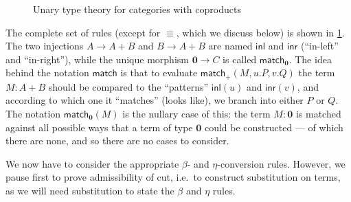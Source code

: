 \documentclass{book}
\def\idfunc{\mathsf{id}}
\let\types\vdash
\def\type{\;\ftype}
\def\plusE{\mathord{+}E}
\def\plusI{\mathord{+}I}
\def\inl{\mathsf{inl}}
\def\inr{\mathsf{inr}}
\def\acase#1#2{\mathsf{match}_{#1+#2}}
\def\case{\mathsf{match}_+}
\def\match{\mathsf{match}}
\def\zero{\mathbf{0}}
\def\zeroE{\mathbf{0}E}
\def\abort{\match_{\zero}}
\begin{document}
\begin{figure}
  \centering
  \caption{Unary type theory for categories with coproducts}
  \label{fig:catcoprod}
\end{figure}

The complete set of rules (except for $\equiv$, which we discuss below) is shown in \cref{fig:catcoprod}.
The two injections $A\to A+B$ and $B\to A+B$ are named $\inl$ and $\inr$ (``in-left'' and ``in-right''), while the unique morphism $\zero \to C$ is called $\abort$.
The idea behind the notation $\match$ is that to evaluate $\case(M,u.P,v.Q)$ the term $M:A+B$ should be compared to the ``patterns'' $\inl(u)$ and $\inr(v)$, and according to which one it ``matches'' (looks like), we branch into either $P$ or $Q$.
The notation $\abort(M)$ is the nullary case of this: the term $M:\zero$ is matched against all possible ways that a term of type $\zero$ could be constructed --- of which there are none, and so there are no cases to consider.


We now have to consider the appropriate $\beta$- and $\eta$-conversion rules.
However, we pause first to prove admissibility of cut, i.e.\ to construct substitution on terms, as we will need substitution to state the $\beta$ and $\eta$ rules.
\end{document}

